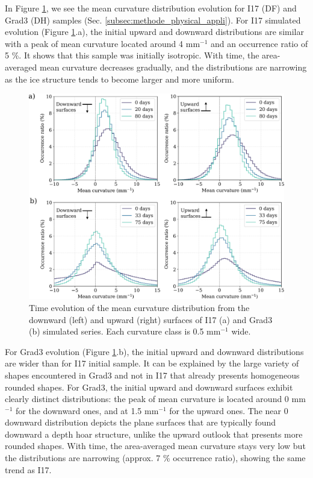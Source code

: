 \documentclass[draft,ms]{agujournal2019}
\begin{document}
In Figure \ref{fig:histo_i17_grad3}, we see the mean curvature distribution evolution for I17 (DF) and Grad3 (DH) samples (Sec. \ref{subsec:methode_physical_appli}). For I17 simulated evolution (Figure \ref{fig:histo_i17_grad3}.a), the initial upward and downward distributions are similar with a peak of mean curvature located around 4 mm$^{-1}$ and an occurrence ratio of 5 \%. It shows that this sample was initially isotropic. With time, the area-averaged mean curvature decreases gradually, and the distributions are narrowing as the ice structure tends to become larger and more uniform.\\
\begin{figure}
    \centering
    \includegraphics[width=\linewidth]{Figures/histo_i17_grad3_copie_invert.pdf}
    \caption{Time evolution of the mean curvature distribution from the downward (left) and upward (right) surfaces of I17 (a) and Grad3 (b) simulated series. Each curvature class is 0.5 mm$^{-1}$ wide.}
    \label{fig:histo_i17_grad3}
\end{figure}

For Grad3 evolution (Figure \ref{fig:histo_i17_grad3}.b), the initial upward and downward distributions are wider than for I17 initial sample. It can be explained by the large variety of shapes encountered in Grad3 and not in I17 that already presents homogeneous rounded shapes. For Grad3, the initial upward and downward surfaces exhibit clearly distinct distributions: the peak of mean curvature is located around 0 mm$^{-1}$ for the downward ones, and at 1.5 mm$^{-1}$ for the upward ones. The near 0 downward distribution depicts the plane surfaces that are typically found downward a depth hoar structure, unlike the upward outlook that presents more rounded shapes. With time, the area-averaged mean curvature stays very low but the distributions are narrowing (approx. 7 \% occurrence ratio), showing the same trend as I17.\\
\end{document}
